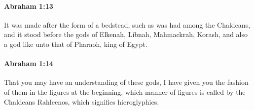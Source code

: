 		\paragraph{Abraham 1:13} %
			\label{ABRAHAM-1-13}

			It was made after the form of a bedstead, such as was had among the Chaldeans, and it stood before the gods of Elkenah, Libnah, Mahmackrah, Korash, and also a god like unto that of Pharaoh, king of Egypt.


		\paragraph{Abraham 1:14} %
			\label{ABRAHAM-1-14}

			That you may have an understanding of these gods, I have given you the fashion of them in the figures at the beginning, which manner of figures is called by the Chaldeans Rahleenos, which signifies hieroglyphics.


